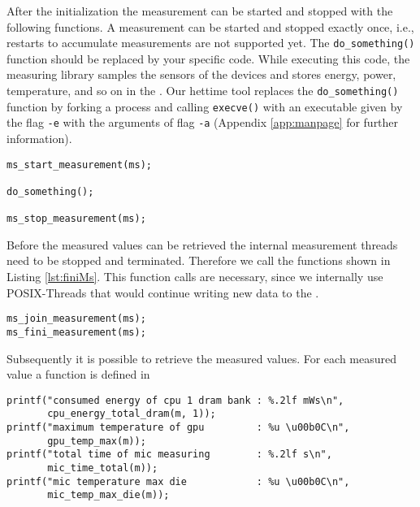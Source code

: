 After the initialization the measurement can be started and stopped with the following functions. A measurement can be started and stopped exactly once, i.e., restarts to accumulate measurements are not supported yet. The \texttt{do\_something()} function should be replaced by your specific code. While executing this code, the measuring library samples the sensors of the devices and stores energy, power, temperature, and so on in the . Our hettime tool replaces the \texttt{do\_something()} function by forking a process and calling \texttt{execve()} with an executable given by the flag \texttt{-e} with the arguments of flag \texttt{-a} (Appendix \ref{app:manpage} for further information).
\begin{lstlisting}[caption={The start and stop functions trigger the measuring procedures of the measuring library. Please replace the \texttt{do\_something()} function by the code you want to execute while the measuring system is running.},label=lst:StartStopMS]
ms_start_measurement(ms);

do_something();

ms_stop_measurement(ms);
\end{lstlisting}

Before the measured values can be retrieved the internal measurement threads need to be stopped and terminated. Therefore we call the functions shown in Listing \ref{lst:finiMs}. This function calls are necessary, since we internally use POSIX-Threads that would continue writing new data to the .
\begin{lstlisting}[caption={Functions to join and terminate measurement threads.},label=lst:finiMs]
ms_join_measurement(ms);
ms_fini_measurement(ms);
\end{lstlisting}

Subsequently it is possible to retrieve the measured values. For each measured value a function is defined in 

\begin{lstlisting}[caption={Example for getting the measured values.},label=lst:msValues]
printf("consumed energy of cpu 1 dram bank : %.2lf mWs\n",
	   cpu_energy_total_dram(m, 1));
printf("maximum temperature of gpu         : %u \u00b0C\n",
	   gpu_temp_max(m));
printf("total time of mic measuring        : %.2lf s\n",
	   mic_time_total(m));
printf("mic temperature max die            : %u \u00b0C\n",
	   mic_temp_max_die(m));
\end{lstlisting}

